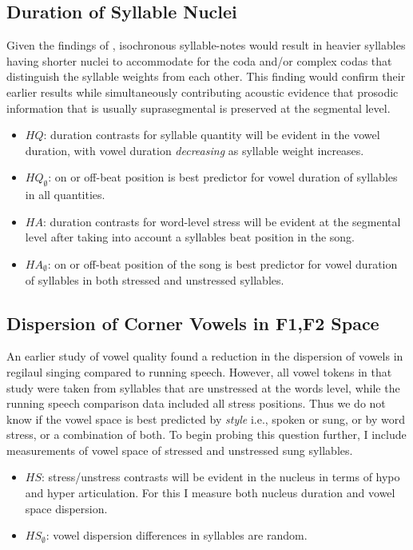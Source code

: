 \subsection{Duration of Syllable Nuclei}
Given the findings of \citep{rossLehiste2001}, isochronous syllable-notes would result in heavier syllables having shorter nuclei to accommodate for the coda and/or complex codas that distinguish the syllable weights from each other. This finding would confirm their earlier results while simultaneously contributing acoustic evidence that prosodic information that is usually suprasegmental is preserved at the segmental level. 
	\begin{itemize}

	\item \(HQ\): duration contrasts for syllable quantity will be evident in the vowel duration, with vowel duration {\it decreasing} as syllable weight increases.
	\item \(HQ_{\emptyset}\): on or off-beat position is best predictor for vowel duration of syllables in all quantities. 

	\item \(HA\): duration contrasts for word-level stress will be evident at the segmental level after taking into account a syllables beat position in the song. 
	\item \(HA_{\emptyset}\): on or off-beat position of the song is best predictor for vowel duration of syllables in both stressed and unstressed syllables. 

	\end{itemize}

\subsection{Dispersion of Corner Vowels in F1,F2 Space}
An earlier study of vowel quality \cite{Ross1990} found a reduction in the dispersion of vowels in regilaul singing compared to running speech. However, all vowel tokens in that study were taken from syllables that are unstressed at the words level, while the running speech comparison data included all stress positions. Thus we do not know if the vowel space is best predicted by {\it style} i.e., spoken or sung, or by word stress, or a combination of both. 
To begin probing this question further, I include measurements of vowel space of stressed and unstressed sung syllables. 
	\begin{itemize}
	\item \(HS\): stress/unstress contrasts will be evident in the nucleus in terms of hypo and hyper articulation. For this I measure both nucleus duration and vowel space dispersion. 
	\item \(HS_{\emptyset}\): vowel dispersion differences in syllables are random. 
	\end{itemize}



